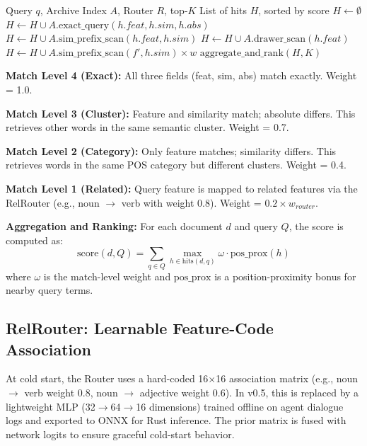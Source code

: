 \documentclass[11pt,a4paper]{article}
\theoremstyle{definition}
\begin{document}
\begin{algorithm}[H]
\caption{Cabinet Retrieval Algorithm}
\label{alg:retrieve}
\begin{algorithmic}[1]
\Require Query $q$, Archive Index $A$, Router $R$, top-$K$
\Ensure List of hits $H$, sorted by score
\State $H \gets \emptyset$
    \State $H \gets H \cup A.\text{exact\_query}(h.feat, h.sim, h.abs)$ 
    \State $H \gets H \cup A.\text{sim\_prefix\_scan}(h.feat, h.sim)$ 
    \State $H \gets H \cup A.\text{drawer\_scan}(h.feat)$ 
        \State $H \gets H \cup A.\text{sim\_prefix\_scan}(f', h.sim) \times w$ 
    \EndFor
\EndFor
\State \Return $\text{aggregate\_and\_rank}(H, K)$
\end{algorithmic}
\end{algorithm}

\textbf{Match Level 4 (Exact):} All three fields (feat, sim, abs) match exactly. Weight = 1.0.

\textbf{Match Level 3 (Cluster):} Feature and similarity match; absolute differs. This retrieves other words in the same semantic cluster. Weight = 0.7.

\textbf{Match Level 2 (Category):} Only feature matches; similarity differs. This retrieves words in the same POS category but different clusters. Weight = 0.4.

\textbf{Match Level 1 (Related):} Query feature is mapped to related features via the RelRouter (e.g., noun $\rightarrow$ verb with weight 0.8). Weight = $0.2 \times w_{router}$.

\textbf{Aggregation and Ranking:} For each document $d$ and query $Q$, the score is computed as:
\begin{equation}
\text{score}(d, Q) = \sum_{q \in Q} \max_{h \in \text{hits}(d,q)} \omega \cdot \text{pos\_prox}(h)
\end{equation}
where $\omega$ is the match-level weight and $\text{pos\_prox}$ is a position-proximity bonus for nearby query terms.

\subsection{RelRouter: Learnable Feature-Code Association}

At cold start, the Router uses a hard-coded 16$\times$16 association matrix (e.g., noun $\rightarrow$ verb weight 0.8, noun $\rightarrow$ adjective weight 0.6). In v0.5, this is replaced by a lightweight MLP (32$\rightarrow$64$\rightarrow$16 dimensions) trained offline on agent dialogue logs and exported to ONNX for Rust inference. The prior matrix is fused with network logits to ensure graceful cold-start behavior.
\end{document}
